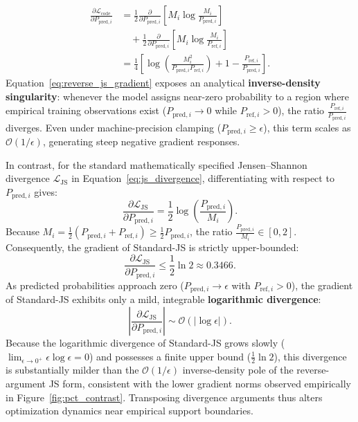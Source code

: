 \begin{equation}
\begin{aligned}
\frac{\partial \mathcal{L}_{\text{code}}}{\partial P_{\text{pred}, i}} &= \frac{1}{2} \frac{\partial}{\partial P_{\text{pred}, i}} \left[ M_i \log \frac{M_i}{P_{\text{pred}, i}} \right] \\
&\quad + \frac{1}{2} \frac{\partial}{\partial P_{\text{pred}, i}} \left[ M_i \log \frac{M_i}{P_{\text{ref}, i}} \right] \\
&= \frac{1}{4} \left[ \log \left(\frac{M_i^2}{P_{\text{pred}, i} P_{\text{ref}, i}}\right) + 1 - \frac{P_{\text{ref}, i}}{P_{\text{pred}, i}} \right].
\end{aligned}
\label{eq:reverse_js_gradient}
\end{equation}
Equation~\eqref{eq:reverse_js_gradient} exposes an analytical \textbf{inverse-density singularity}: whenever the model assigns near-zero probability to a region where empirical training observations exist ($P_{\text{pred}, i} \to 0$ while $P_{\text{ref}, i} > 0$), the ratio $\frac{P_{\text{ref}, i}}{P_{\text{pred}, i}}$ diverges. Even under machine-precision clamping ($P_{\text{pred}, i} \ge \epsilon$), this term scales as $\mathcal{O}(1/\epsilon)$, generating steep negative gradient responses.

In contrast, for the standard mathematically specified Jensen--Shannon divergence $\mathcal{L}_{\text{JS}}$ in Equation~\eqref{eq:js_divergence}, differentiating with respect to $P_{\text{pred}, i}$ gives:
\begin{equation}
\frac{\partial \mathcal{L}_{\text{JS}}}{\partial P_{\text{pred}, i}} = \frac{1}{2} \log \left(\frac{P_{\text{pred}, i}}{M_i}\right).
\label{eq:standard_js_gradient}
\end{equation}
Because $M_i = \frac{1}{2}(P_{\text{pred}, i} + P_{\text{ref}, i}) \ge \frac{1}{2}P_{\text{pred}, i}$, the ratio $\frac{P_{\text{pred}, i}}{M_i} \in [0, 2]$. Consequently, the gradient of Standard-JS is strictly upper-bounded:
\begin{equation}
\frac{\partial \mathcal{L}_{\text{JS}}}{\partial P_{\text{pred}, i}} \le \frac{1}{2} \ln 2 \approx 0.3466.
\end{equation}
As predicted probabilities approach zero ($P_{\text{pred}, i} \to \epsilon$ with $P_{\text{ref}, i} > 0$), the gradient of Standard-JS exhibits only a mild, integrable \textbf{logarithmic divergence}:
\begin{equation}
\left| \frac{\partial \mathcal{L}_{\text{JS}}}{\partial P_{\text{pred}, i}} \right| \sim \mathcal{O}(|\log \epsilon|).
\end{equation}
Because the logarithmic divergence of Standard-JS grows slowly ($\lim_{\epsilon \to 0^+} \epsilon \log \epsilon = 0$) and possesses a finite upper bound ($\frac{1}{2}\ln 2$), this divergence is substantially milder than the $\mathcal{O}(1/\epsilon)$ inverse-density pole of the reverse-argument JS form, consistent with the lower gradient norms observed empirically in Figure~\ref{fig:pct_contrast}. Transposing divergence arguments thus alters optimization dynamics near empirical support boundaries.

